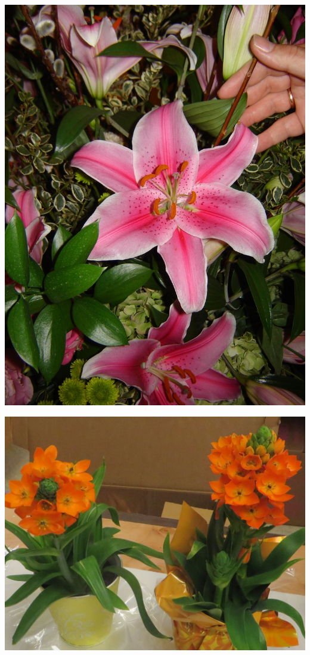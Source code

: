 \documentclass{article}
\begin{document}
\begin{center}
\includegraphics[height=0.9\textheight, angle=90]{../Stargazer_(OrientalLily).jpg}
\end{center}
\newpage

\begin{center}
\includegraphics[height=0.9\textheight, angle=90]{../StarOfBethlehem.jpg}
\end{center}
\newpage
\end{document}

